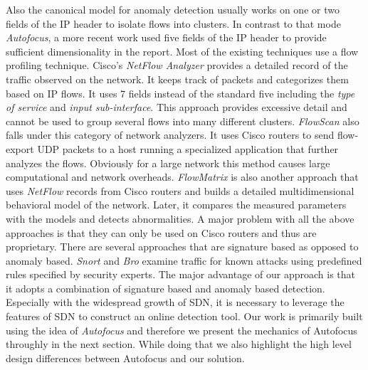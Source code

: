 \documentclass[twocolumn]{article}
\begin{document}
Also the canonical model for anomaly detection usually works on one or two fields of the IP header to isolate flows into clusters. In contrast to that mode \emph{Autofocus}, a more recent work used five fields of the IP header to provide sufficient dimensionality in the report.  Most of the existing techniques use a flow profiling technique. Cisco’s \emph{NetFlow Analyzer} provides a detailed record of the traffic observed on the network. It keeps track of packets and categorizes them based on IP flows. It uses 7 fields instead of the standard five including the \emph{type of service} and \emph{input sub-interface}. This approach provides excessive detail and cannot be used to group several flows into many different clusters.  \emph{FlowScan} also falls under this category of network analyzers. It uses Cisco routers to send flow-export UDP packets to a host running a specialized application that further analyzes the flows. Obviously for a large network this method causes large computational and network overheads. \emph{FlowMatrix} \cite{flowmatrix}  is also another approach that uses \emph{NetFlow} records from Cisco routers and builds a detailed multidimensional behavioral model of the network. Later, it compares the measured parameters with the models and detects abnormalities. A major problem with all the above approaches is that they can only be used on Cisco routers and thus are proprietary. There are several approaches that are signature based as opposed to anomaly based. \emph{Snort} \cite{snort} and \emph{Bro} \cite{bro} examine traffic for known attacks using predefined rules specified by security experts. The major advantage of our approach is that it adopts a combination of signature based and anomaly based detection. Especially with the widespread growth of SDN, it is necessary to leverage the features of SDN to construct an online detection tool. Our work is primarily built using the idea of \emph{Autofocus} \cite{autofocus} and therefore we present the mechanics of Autofocus throughly in the next section. While doing that we also highlight the high level design differences between Autofocus and our solution.
\end{document}
